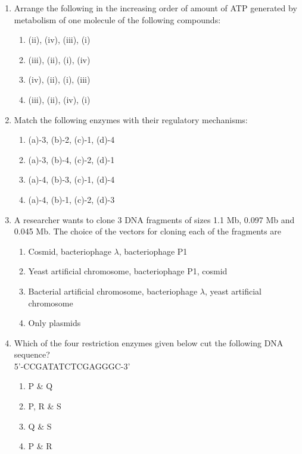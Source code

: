 \documentclass[journal]{IEEEtran}
\begin{document}
\begin{enumerate}
\item Arrange the following in the increasing order of amount of ATP generated by metabolism of one molecule of the following compounds:\hfill  \textit{}
\begin{enumerate}
    \item (ii), (iv), (iii), (i)
    \item (iii), (ii), (i), (iv)
    \item (iv), (ii), (i), (iii)
    \item (iii), (ii), (iv), (i)
\end{enumerate}

\item Match the following enzymes with their regulatory mechanisms:\hfill  \textit{}
\begin{enumerate}
    \item (a)-3, (b)-2, (c)-1, (d)-4
    \item (a)-3, (b)-4, (c)-2, (d)-1
    \item (a)-4, (b)-3, (c)-1, (d)-4
    \item (a)-4, (b)-1, (c)-2, (d)-3
\end{enumerate}

\item A researcher wants to clone 3 DNA fragments of sizes 1.1 Mb, 0.097 Mb and 0.045 Mb. The choice of the vectors for cloning each of the fragments are\hfill  \textit{}
\begin{enumerate}
    \item Cosmid, bacteriophage $\lambda$, bacteriophage P1
    \item Yeast artificial chromosome, bacteriophage P1, cosmid
    \item Bacterial artificial chromosome, bacteriophage $\lambda$, yeast artificial chromosome
    \item Only plasmids
\end{enumerate}

\item Which of the four restriction enzymes given below cut the following DNA sequence?\\
5'-CCGATATCTCGAGGGC-3'\hfill  \textit{}
\begin{enumerate}
    \item P \& Q
    \item P, R \& S
    \item Q \& S
    \item P \& R
\end{enumerate}


\end{enumerate}
\end{document}
